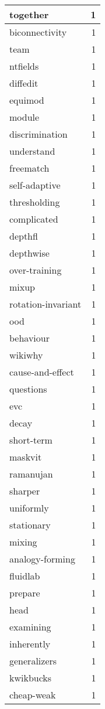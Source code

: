 \begin{table}[h]
\begin{tabular}{|l|r|}
\hline
together & 1 \\
\hline
biconnectivity & 1 \\
\hline
team & 1 \\
\hline
ntfields & 1 \\
\hline
diffedit & 1 \\
\hline
equimod & 1 \\
\hline
module & 1 \\
\hline
discrimination & 1 \\
\hline
understand & 1 \\
\hline
freematch & 1 \\
\hline
self-adaptive & 1 \\
\hline
thresholding & 1 \\
\hline
complicated & 1 \\
\hline
depthfl & 1 \\
\hline
depthwise & 1 \\
\hline
over-training & 1 \\
\hline
mixup & 1 \\
\hline
rotation-invariant & 1 \\
\hline
ood & 1 \\
\hline
behaviour & 1 \\
\hline
wikiwhy & 1 \\
\hline
cause-and-effect & 1 \\
\hline
questions & 1 \\
\hline
evc & 1 \\
\hline
decay & 1 \\
\hline
short-term & 1 \\
\hline
maskvit & 1 \\
\hline
ramanujan & 1 \\
\hline
sharper & 1 \\
\hline
uniformly & 1 \\
\hline
stationary & 1 \\
\hline
mixing & 1 \\
\hline
analogy-forming & 1 \\
\hline
fluidlab & 1 \\
\hline
prepare & 1 \\
\hline
head & 1 \\
\hline
examining & 1 \\
\hline
inherently & 1 \\
\hline
generalizers & 1 \\
\hline
kwikbucks & 1 \\
\hline
cheap-weak & 1 \\

\end{tabular}
\end{table}
